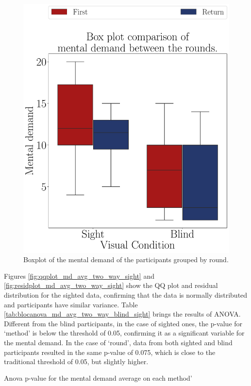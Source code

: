 \begin{figure}[!htb]
\begin{minipage}{0.45\textwidth}
        \includegraphics[width = 0.8\linewidth]{Resultados/Nasa/Figuras/pdf/boxplot_noBase_md_4_rounds.pdf}
        \caption{Boxplot of the mental demand of the participants grouped by round.}
        \label{fig:boxplot_noBase_md_4_rounds}
    \end{minipage}
\end{figure}

Figures \ref{fig:qqplot_md_avg_two_way_sight} and \ref{fig:residplot_md_avg_two_way_sight} show the QQ plot and residual distribution for the sighted data, confirming that the data is normally distributed and participants have similar variance. Table \ref{tab:blocanova_md_avg_two_way_blind_sight} brings the results of ANOVA. Different from the blind participants, in the case of sighted ones, the p-value for ‘method’ is below the threshold of 0.05, confirming it as a significant variable for the mental demand. In the case of ‘round’, data from both sighted and blind participants resulted in the same p-value of 0.075, which is close to the traditional threshold of 0.05, but slightly higher. 

\begin{table}[!thb]
    \caption{Anova p-value for the mental demand average on each method'}
    \label{tab:blocanova_md_avg_two_way_blind_sight}
\begin{minipage}{0.45\textwidth}
    
\end{minipage}
\begin{minipage}{0.45\textwidth}
        
\end{minipage}
\end{table}

